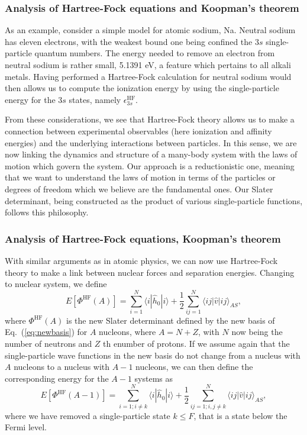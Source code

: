 \documentclass{beamer}
\begin{document}
\begin{frame}
\frametitle{Analysis of Hartree-Fock equations and Koopman's theorem}

\begin{block}{}
As an example, consider a simple model for atomic sodium, Na. Neutral sodium has eleven electrons, 
with the weakest bound one being confined the $3s$ single-particle quantum numbers. The energy needed to remove an electron from neutral sodium is rather small, 5.1391 eV, a feature which pertains to all alkali metals.
Having performed a  Hartree-Fock calculation for neutral sodium would then allows us to compute the
ionization energy by using the single-particle energy for the $3s$ states, namely $\epsilon_{3s}^{\mathrm{HF}}$. 

From these considerations, we see that Hartree-Fock theory allows us to make a connection between experimental 
observables (here ionization and affinity energies) and the underlying interactions between particles.  
In this sense, we are now linking the dynamics and structure of a many-body system with the laws of motion which govern the system. Our approach is a reductionistic one, meaning that we want to understand the laws of motion 
in terms of the particles or degrees of freedom which we believe are the fundamental ones. Our Slater determinant, being constructed as the product of various single-particle functions, follows this philosophy.
\end{block}
\end{frame}

\begin{frame}
\frametitle{Analysis of Hartree-Fock equations, Koopman's theorem}

\begin{block}{}
With similar arguments as in atomic physics, we can now use Hartree-Fock theory to make a link
between nuclear forces and separation energies. Changing to nuclear system, we define
\[
  E[\Phi^{\mathrm{HF}}(A)] 
  = \sum_{i=1}^N \langle i | \hat{h}_0 | i \rangle +
  \frac{1}{2}\sum_{ij=1}^N\langle ij|\hat{v}|ij\rangle_{AS},
\]
where $\Phi^{\mathrm{HF}}(A)$ is the new Slater determinant defined by the new basis of Eq.~(\ref{eq:newbasis})
for $A$ nucleons, where $A=N+Z$, with $N$ now being the number of neutrons and $Z$ th enumber of protons.  If we assume again that the single-particle wave functions in the new basis do not change from a nucleus with $A$ nucleons to a nucleus with $A-1$  nucleons, we can then define the corresponding energy for the $A-1$ systems as 
\[
  E[\Phi^{\mathrm{HF}}(A-1)] 
  = \sum_{i=1; i\ne k}^N \langle i | \hat{h}_0 | i \rangle +
  \frac{1}{2}\sum_{ij=1;i,j\ne k}^N\langle ij|\hat{v}|ij\rangle_{AS},
\]
where we have removed a single-particle state $k\le F$, that is a state below the Fermi level.  
\end{block}
\end{frame}
\end{document}
